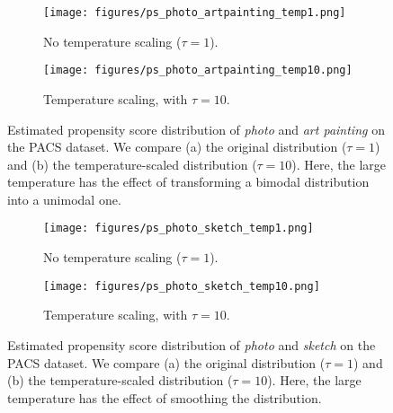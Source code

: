 \begin{figure}[ht!]
     \centering
     \begin{subfigure}[b]{0.49\textwidth}
         \centering
         \texttt{[image: figures/ps\_photo\_artpainting\_temp1.png]}
         \caption{No temperature scaling ($\tau=1$).}
     \end{subfigure}
     \hfill
     \begin{subfigure}[b]{0.49\textwidth}
         \centering
         \texttt{[image: figures/ps\_photo\_artpainting\_temp10.png]}
         \caption{Temperature scaling, with $\tau=10$.}
     \end{subfigure}
    \caption{
        Estimated propensity score distribution of \emph{photo} and \emph{art painting} on the
        PACS dataset. We compare (a) the original distribution ($\tau=1$) and (b) the
        temperature-scaled distribution ($\tau=10$). Here, the large temperature has the effect of
        transforming a bimodal distribution into a unimodal one.
}
    \label{fig:pacs_ps_pa}
\end{figure}
\begin{figure}[ht!]
     \centering
     \begin{subfigure}[b]{0.49\textwidth}
         \centering
         \texttt{[image: figures/ps\_photo\_sketch\_temp1.png]}
         \caption{No temperature scaling ($\tau = 1$).}
     \end{subfigure}
     \hfill
     \begin{subfigure}[b]{0.49\textwidth}
         \centering
         \texttt{[image: figures/ps\_photo\_sketch\_temp10.png]}
         \caption{Temperature scaling, with $\tau=10$.}
     \end{subfigure}
    \caption{
        Estimated propensity score distribution of \emph{photo} and \emph{sketch} on the PACS
        dataset. We compare (a) the original distribution ($\tau=1$) and (b) the temperature-scaled
        distribution ($\tau=10$). Here, the large temperature has the effect of smoothing the
        distribution.
}
    \label{fig:pacs_ps_ps}
\end{figure}


